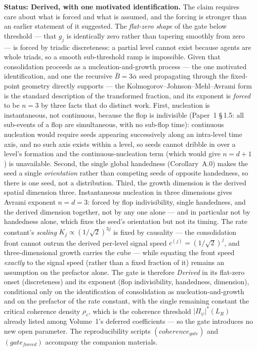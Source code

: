 \documentclass[11pt,oneside]{report}
\theoremstyle{definition}
\theoremstyle{remark}
\begin{document}
\textbf{Status: Derived, with one motivated identification.} The claim requires care
about what is forced and what is assumed, and the forcing is stronger than an earlier
statement of it suggested. The \emph{flat-zero shape} of the gate below threshold ---
that \ensuremath{g_j} is identically zero rather than tapering smoothly from zero --- is forced
by triadic discreteness: a partial level cannot exist because agents are whole
triads, so a smooth sub-threshold ramp is impossible. Given that consolidation
proceeds as a nucleation-and-growth process --- the one motivated identification, and
one the recursive \ensuremath{\bar{B}=3\bar{\alpha}} seed propagating through the fixed-point
geometry directly supports --- the Kolmogorov--Johnson--Mehl--Avrami form is the
standard description of the transformed fraction, and its exponent is \emph{forced}
to be \ensuremath{n=3} by three facts that do distinct work. First, nucleation is
instantaneous, not continuous, because the flop is indivisible (Paper~1 \S\,1.5:
all sub-events of a flop are simultaneous, with no sub-flop time): continuous
nucleation would require seeds appearing successively along an intra-level time axis,
and no such axis exists within a level, so seeds cannot dribble in over a level's
formation and the continuous-nucleation term (which would give \ensuremath{n=d+1}) is
unavailable. Second, the single global handedness (Corollary~A.0) makes the seed a
single \emph{orientation} rather than competing seeds of opposite handedness, so
there is one seed, not a distribution. Third, the growth dimension is the derived
spatial dimension three. Instantaneous nucleation in three dimensions gives Avrami
exponent \ensuremath{n=d=3}: forced by flop indivisibility, single handedness, and the derived
dimension together, not by any one alone --- and in particular not by handedness
alone, which fixes the seed's orientation but not its timing. The rate constant's
\emph{scaling} \ensuremath{K_j \propto (1/\sqrt{2})^{3j}} is fixed by causality --- the
consolidation front cannot outrun the derived per-level signal speed
\ensuremath{c^{(j)}=(1/\sqrt{2})^{j}}, and three-dimensional growth carries the cube --- while
equating the front speed \emph{exactly} to the signal speed (rather than a fixed
fraction of it) remains an assumption on the prefactor alone. The gate is therefore
\emph{Derived} in its flat-zero onset (discreteness) and its exponent (flop
indivisibility, handedness, dimension), conditional only on the identification of
consolidation as nucleation-and-growth and on the prefactor of the rate constant,
with the single remaining constant the critical coherence density \ensuremath{\rho_c}, which is
the coherence threshold \ensuremath{\lvert\Pi_\psi\rvert^{*}(L_R)} already listed among
Volume~1's deferred coefficients --- so the gate introduces no new open parameter.
The reproducibility scripts \ensuremath{(coherence_{gate})} and \ensuremath{(gate_{forced})} accompany
the companion materials.
\end{document}

